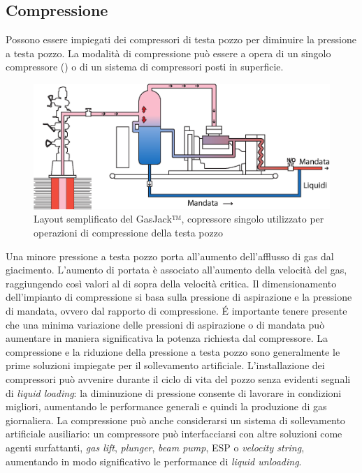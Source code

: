\subsection{Compressione}
Possono essere impiegati dei compressori di testa pozzo per diminuire la pressione a testa pozzo. La modalità di compressione può essere a opera di un singolo compressore () o di un sistema di compressori posti in superficie. 

\begin{figure}[htbp]
    \centering
    \includegraphics[width=\textwidth]{fig/foamer/compressore.eps}
    \caption{Layout semplificato del GasJack™, copressore singolo utilizzato per operazioni di compressione della testa pozzo \parencite{garner2009backside}}
    \label{fig:compressore}
\end{figure}

Una minore pressione a testa pozzo porta all'aumento dell'afflusso di gas dal giacimento. L'aumento di portata è associato all'aumento della velocità del gas, raggiungendo così valori al di sopra della velocità critica. Il dimensionamento dell'impianto di compressione si basa sulla pressione di aspirazione e la pressione di mandata, ovvero dal rapporto di compressione. \'E importante tenere presente che una minima variazione delle pressioni di aspirazione o di mandata può aumentare in maniera significativa la potenza richiesta dal compressore. La compressione e la riduzione della pressione a testa pozzo sono generalmente le prime soluzioni impiegate per il sollevamento artificiale. L'installazione dei compressori può avvenire durante il ciclo di vita del pozzo senza evidenti segnali di \textit{liquid loading}: la diminuzione di pressione consente di lavorare in condizioni migliori, aumentando le performance generali e quindi la produzione di gas giornaliera. La compressione può anche considerarsi un sistema di sollevamento artificiale ausiliario: un compressore può interfacciarsi con altre soluzioni come agenti surfattanti, \textit{gas lift}, \textit{plunger}, \textit{beam pump}, ESP o \textit{velocity string}, aumentando in modo significativo le performance di \textit{liquid unloading}. 

